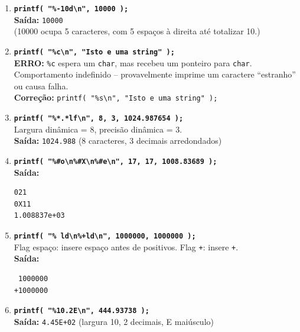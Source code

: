 \documentclass[12pt,a4paper]{article}
\begin{document}
\begin{respostabox}
\begin{enumerate}[label=\textbf{\alph*)}]

\item \textbf{\texttt{printf( "\%-10d\textbackslash n", 10000 );}}\\
\textbf{Saída:} \texttt{10000\textvisiblespace\textvisiblespace\textvisiblespace\textvisiblespace\textvisiblespace}\\
(10000 ocupa 5 caracteres, com 5 espaços à direita até totalizar 10.)

\item \textbf{\texttt{printf( "\%c\textbackslash n", "Isto e uma string" );}}\\
\textbf{ERRO:} \texttt{\%c} espera um \texttt{char}, mas recebeu um ponteiro para
\texttt{char}. Comportamento indefinido -- provavelmente imprime um caractere
``estranho'' ou causa falha.\\
\textbf{Correção:} \texttt{printf( "\%s\textbackslash n", "Isto e uma string" );}

\item \textbf{\texttt{printf( "\%*.*lf\textbackslash n", 8, 3, 1024.987654 );}}\\
Largura dinâmica = 8, precisão dinâmica = 3.\\
\textbf{Saída:} \texttt{1024.988} \quad (8 caracteres, 3 decimais arredondados)

\item \textbf{\texttt{printf( "\%\#o\textbackslash n\%\#X\textbackslash n\%\#e\textbackslash n", 17, 17, 1008.83689 );}}\\
\textbf{Saída:}
\begin{verbatim}
021
0X11
1.008837e+03
\end{verbatim}

\item \textbf{\texttt{printf( "\% ld\textbackslash n\%+ld\textbackslash n", 1000000, 1000000 );}}\\
Flag espaço: insere espaço antes de positivos. Flag \texttt{+}: insere \texttt{+}.\\
\textbf{Saída:}
\begin{verbatim}
 1000000
+1000000
\end{verbatim}

\item \textbf{\texttt{printf( "\%10.2E\textbackslash n", 444.93738 );}}\\
\textbf{Saída:} \texttt{\textvisiblespace\textvisiblespace 4.45E+02} \quad (largura 10, 2 decimais, E maiúsculo)


\end{enumerate}
\end{respostabox}
\end{document}
